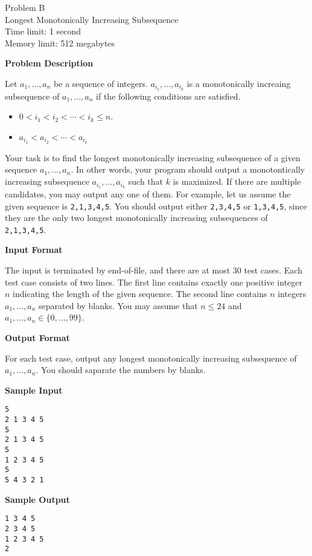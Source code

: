 \documentclass[11pt]{article}
\begin{document}
\begin{center}
    {\LARGE Problem B}\\
    {\Large Longest Monotonically Increasing Subsequence}\\
    {Time limit: 1 second}\\
    {Memory limit: 512 megabytes}
\end{center}

\textbf{\large Problem Description}

Let $a_1,\dots,a_n$ be a sequence of integers.
$a_{i_1},\dots,a_{i_k}$ is a monotonically increaing subsequence of 
$a_1,\dots,a_n$ if the following conditions are satisfied.
\begin{itemize}
\item $0<i_1<i_2<\cdots<i_k\le n$.
\item $a_{i_1}<a_{i_2}<\cdots<a_{i_k}$
\end{itemize}
Your task is to find the longest monotonically increasing subsequence of
a given sequence $a_1,\dots,a_n$. In other words, your program should output 
a monotontically increasing subsequence $a_{i_1},\dots,a_{i_k}$ such that $k$ 
is maximized. If there are multiple candidates, you may output any one of them.
For example, let us assume the given sequence is 
\verb+2,1,3,4,5+. You should output either \verb+2,3,4,5+ or \verb+1,3,4,5+,
since they are the only two longest monotonically increasing subsequences
of \verb+2,1,3,4,5+.

\textbf{\large Input Format}

The input is terminated by end-of-file, and there are at most 30 test cases.
Each test case consists of two lines. The first line contains exactly one 
positive integer $n$ indicating the length of the given sequence. The second 
line contains $n$ integers $a_1,\dots,a_n$ separated by blanks.
You may assume that $n \le 24$ and $a_1,\dots,a_n\in\{0,\dots,99\}$.

\textbf{\large Output Format}

For each test case, output any longest monotonically increasing subsequence
of $a_1,\dots,a_n$. You should saparate the numbers by blanks.

\textbf{\large Sample Input}

\begin{verbatim}
5
2 1 3 4 5
5
2 1 3 4 5
5
1 2 3 4 5
5
5 4 3 2 1
\end{verbatim}

\textbf{\large Sample Output}
\begin{verbatim}
1 3 4 5
2 3 4 5
1 2 3 4 5
2
\end{verbatim}
\end{document}
